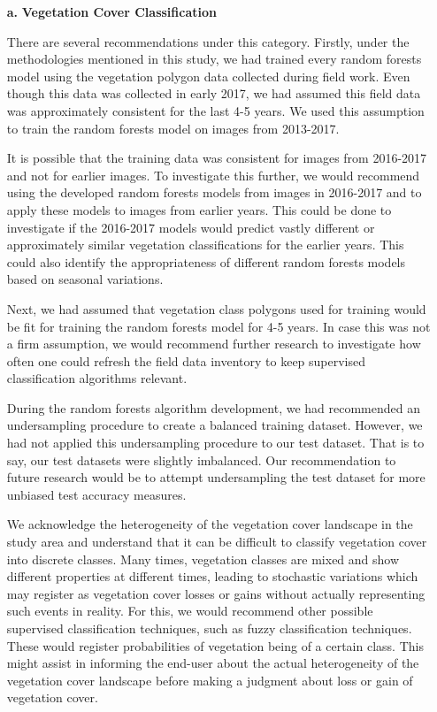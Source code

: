 \begin{itemize}
	\item [\textbf{a.}] \textbf{Vegetation Cover Classification}
	
	There are several recommendations under this category. Firstly, under the methodologies mentioned in this study, we had trained every random forests model using the vegetation polygon data collected during field work. Even though this data was collected in early 2017, we had assumed this field data was approximately consistent for the last 4-5 years. We used this assumption to train the random forests model on images from 2013-2017. 
	
	\justify
	It is possible that the training data was consistent for images from 2016-2017 and not for earlier images. To investigate this further, we would recommend using the developed random forests models from images in 2016-2017 and to apply these models to images from earlier years. This could be done to investigate if the 2016-2017 models would predict vastly different or approximately similar vegetation classifications for the earlier years. This could also identify the appropriateness of different random forests models based on seasonal variations.
	
	\justify
	Next, we had assumed that vegetation class polygons used for training would be fit for training the random forests model for 4-5 years. In case this was not a firm assumption, we would recommend further research to investigate how often one could refresh the field data inventory to keep supervised classification algorithms relevant. 
	
	\justify
	During the random forests algorithm development, we had recommended an undersampling procedure to create a balanced training dataset. However, we had not applied this undersampling procedure to our test dataset. That is to say, our test datasets were slightly imbalanced. Our recommendation to future research would be to attempt undersampling the test dataset for more unbiased test accuracy measures.
	
	\justify
	We acknowledge the heterogeneity of the vegetation cover landscape in the study area and understand that it can be difficult to classify vegetation cover into discrete classes. Many times, vegetation classes are mixed and show different properties at different times, leading to stochastic variations which may register as vegetation cover losses or gains without actually representing such events in reality. For this, we would recommend other possible supervised classification techniques, such as fuzzy classification techniques. These would register probabilities of vegetation being of a certain class. This might assist in informing the end-user about the actual heterogeneity of the vegetation cover landscape before making a judgment about loss or gain of vegetation cover. 
	

\end{itemize}
